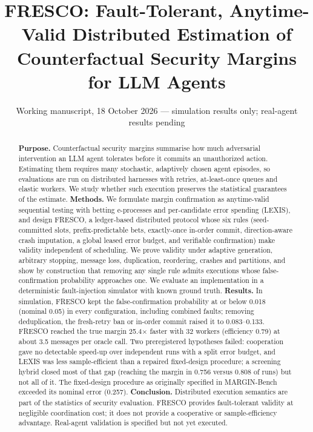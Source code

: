 \documentclass[11pt]{article}
\title{FRESCO: Fault-Tolerant, Anytime-Valid Distributed Estimation of\\ Counterfactual Security Margins for LLM Agents}
\author{\todo{AUTHOR NAMES AND AFFILIATIONS --- INSERT AND VERIFY BEFORE SUBMISSION}}
\date{Working manuscript, 18 October 2026 --- simulation results only; real-agent results pending}
\theoremstyle{definition}
\theoremstyle{remark}
\begin{document}
\maketitle

\begin{abstract}
\noindent\textbf{Purpose.} Counterfactual security margins summarise how much adversarial intervention an LLM agent tolerates before it commits an unauthorized action. Estimating them requires many stochastic, adaptively chosen agent episodes, so evaluations are run on distributed harnesses with retries, at-least-once queues and elastic workers. We study whether such execution preserves the statistical guarantees of the estimate.
\textbf{Methods.} We formulate margin confirmation as anytime-valid sequential testing with betting e-processes and per-candidate error spending (LEXIS), and design FRESCO, a ledger-based distributed protocol whose six rules (seed-committed slots, prefix-predictable bets, exactly-once in-order commit, direction-aware crash imputation, a global leased error budget, and verifiable confirmation) make validity independent of scheduling. We prove validity under adaptive generation, arbitrary stopping, message loss, duplication, reordering, crashes and partitions, and show by construction that removing any single rule admits executions whose false-confirmation probability approaches one. We evaluate an implementation in a deterministic fault-injection simulator with known ground truth.
\textbf{Results.} In simulation, FRESCO kept the false-confirmation probability at or below 0.018 (nominal 0.05) in every configuration, including combined faults; removing deduplication, the fresh-retry ban or in-order commit raised it to 0.083--0.133. FRESCO reached the true margin 25.4$\times$ faster with 32 workers (efficiency 0.79) at about 3.5 messages per oracle call. Two preregistered hypotheses failed: cooperation gave no detectable speed-up over independent runs with a split error budget, and LEXIS was less sample-efficient than a repaired fixed-design procedure; a screening hybrid closed most of that gap (reaching the margin in 0.756 versus 0.808 of runs) but not all of it. The fixed-design procedure as originally specified in MARGIN-Bench exceeded its nominal error (0.257).
\textbf{Conclusion.} Distributed execution semantics are part of the statistics of security evaluation. FRESCO provides fault-tolerant validity at negligible coordination cost; it does not provide a cooperative or sample-efficiency advantage. Real-agent validation is specified but not yet executed.
\end{abstract}
\end{document}

